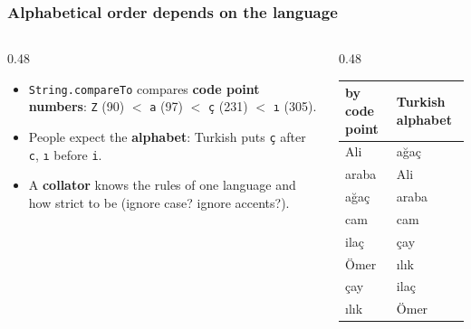 \documentclass[aspectratio=169,10pt,compress]{beamer}
\begin{document}
\begin{frame}[t,fragile] \frametitle{Alphabetical order depends on the language}
  \begin{columns}[T]
    \begin{column}{0.48\textwidth}
      \begin{itemize}\small
        \item \texttt{String.compareTo} compares \textbf{code point numbers}: \texttt{Z} (90) $<$ \texttt{a} (97)
          $<$ \texttt{ç} (231) $<$ \texttt{ı} (305).
        \item People expect the \textbf{alphabet}: Turkish puts \texttt{ç} after \texttt{c}, \texttt{ı} before \texttt{i}.
        \item A \textbf{collator} knows the rules of one language and how strict to be
          (ignore case? ignore accents?).
      \end{itemize}
    \end{column}
    \begin{column}{0.48\textwidth}
      \begin{center}\small
      \begin{tabular}{ll}
        \toprule
        \textbf{by code point} & \textbf{Turkish alphabet} \\
        \midrule
        Ali   & ağaç \\
        araba & Ali \\
        ağaç  & araba \\
        cam   & cam \\
        ilaç  & çay \\
        Ömer  & ılık \\
        çay   & ilaç \\
        ılık  & Ömer \\
        \bottomrule
      \end{tabular}
      \end{center}
    \end{column}
  \end{columns}
\end{frame}
\end{document}
